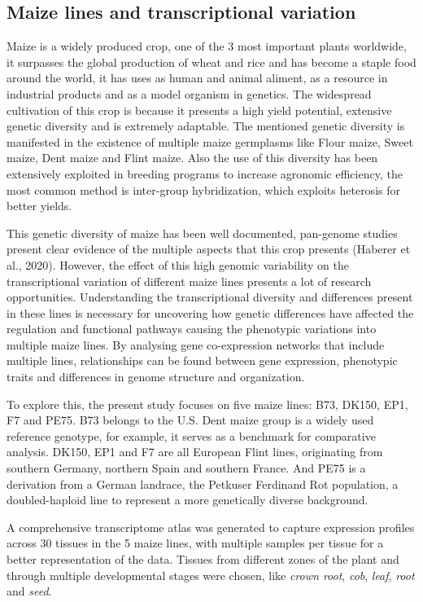 \documentclass[
]{article}
\begin{document}
\hypertarget{maize-lines-and-transcriptional-variation}{%
\subsection{Maize lines and transcriptional
variation}\label{maize-lines-and-transcriptional-variation}}

Maize is a widely produced crop, one of the 3 most important plants
worldwide, it surpasses the global production of wheat and rice and has
become a staple food around the world, it has uses as human and animal
aliment, as a resource in industrial products and as a model organism in
genetics. The widespread cultivation of this crop is because it presents
a high yield potential, extensive genetic diversity and is extremely
adaptable. The mentioned genetic diversity is manifested in the
existence of multiple maize germplasms like Flour maize, Sweet maize,
Dent maize and Flint maize. Also the use of this diversity has been
extensively exploited in breeding programs to increase agronomic
efficiency, the most common method is inter-group hybridization, which
exploits heterosis for better yields.

This genetic diversity of maize has been well documented, pan-genome
studies present clear evidence of the multiple aspects that this crop
presents {(Haberer et al., 2020)}. However, the effect of this high genomic variability on the
transcriptional variation of different maize lines presents a lot of
research opportunities. Understanding the transcriptional diversity and
differences present in these lines is necessary for uncovering how
genetic differences have affected the regulation and functional pathways
causing the phenotypic variations into multiple maize lines. By
analysing gene co-expression networks that include multiple lines,
relationships can be found between gene expression, phenotypic traits
and differences in genome structure and organization.

To explore this, the present study focuses on five maize lines: B73,
DK150, EP1, F7 and PE75. B73 belongs to the U.S. Dent maize group is a
widely used reference genotype, for example, it serves as a benchmark
for comparative analysis. DK150, EP1 and F7 are all European Flint
lines, originating from southern Germany, northern Spain and southern
France. And PE75 is a derivation from a German landrace, the Petkuser
Ferdinand Rot population, a doubled-haploid line to represent a more
genetically diverse background.

A comprehensive transcriptome atlas was generated to capture expression
profiles across 30 tissues in the 5 maize lines, with multiple samples
per tissue for a better representation of the data. Tissues from
different zones of the plant and through multiple developmental stages
were chosen, like \emph{crown root}, \emph{cob}, \emph{leaf},
\emph{root} and \emph{seed}.
\end{document}
